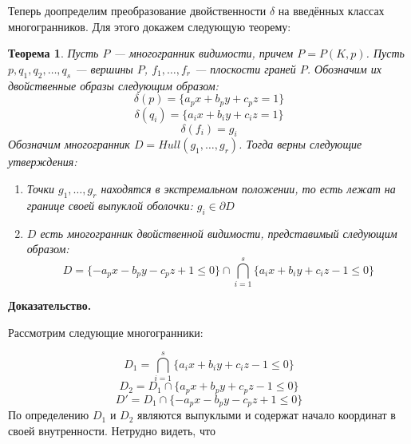 \documentclass[a4paper, 10pt]{article}
\theoremstyle{definition}
\theoremstyle{plain}
\newtheorem{SmartTheorem}{Теорема}
\theoremstyle{plain}
\begin{document}
Теперь доопределим преобразование двойственности $\delta$ на введённых классах
многогранников. Для этого докажем следующую теорему:

\begin{SmartTheorem}
\label{theorem:duality-expansion}
 Пусть $P$ --- многогранник видимости, причем $P = P(K, p)$. Пусть
 $p, q_{1}, q_{2}, \ldots, q_{s}$ --- вершины $P$, $f_{1}, \ldots, f_{r}$ ---
 плоскости граней $P$. Обозначим их двойственные образы следующим образом:
 \begin{equation}
  \delta(p) = \{a_{p} x + b_{p} y + c_{p} z = 1\}
 \end{equation}
 \begin{equation}
  \delta(q_{i}) = \{a_{i} x + b_{i} y + c_{i} z = 1\}
 \end{equation}
 \begin{equation}
  \delta(f_{i}) = g_{i}
 \end{equation}
 Обозначим многогранник $D = Hull(g_{1}, \ldots, g_{r})$. Тогда верны следующие
 утверждения:
 \begin{enumerate}
  \item Точки $g_{1}, \ldots, g_{r}$ находятся в экстремальном положении, то
  есть лежат на границе своей выпуклой оболочки: $g_{i} \in \partial D$
  \item $D$ есть многогранник двойственной видимости, представимый следующим
  образом:
  \begin{equation}
  \label{equation:dual-visibility-polyhedron}
   D = \{-a_{p} x - b_{p} y - c_{p} z + 1 \leq 0\} \cap
   \bigcap \limits_{i = 1}^{s} \{a_{i} x + b_{i} y + c_{i} z - 1 \leq 0\}
  \end{equation}
 \end{enumerate}
\end{SmartTheorem}

\textbf{Доказательство.}

Рассмотрим следующие многогранники:

\begin{equation}
 D_{1} = \bigcap \limits_{i = 1}^{s} \{a_{i} x + b_{i} y + c_{i} z - 1 \leq 0\}
\end{equation}
\begin{equation}
 D_{2} = D_{1} \cap \{a_{p} x + b_{p} y + c_{p} z - 1 \leq 0\}
\end{equation}
\begin{equation}
 D' = D_{1} \cap \{-a_{p} x - b_{p} y - c_{p} z + 1 \leq 0\}
\end{equation}
По определению $D_{1}$ и $D_{2}$ являются выпуклыми и содержат начало координат
в своей внутренности. Нетрудно видеть, что
\end{document}
